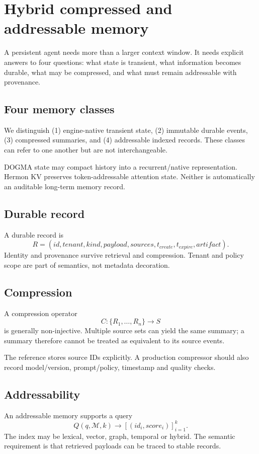 \chapter{Hybrid compressed and addressable memory}

A persistent agent needs more than a larger context window. It needs explicit answers to four questions: what state is transient, what information becomes durable, what may be compressed, and what must remain addressable with provenance.

\section{Four memory classes}
We distinguish (1) engine-native transient state, (2) immutable durable events, (3) compressed summaries, and (4) addressable indexed records. These classes can refer to one another but are not interchangeable.

DOGMA state may compact history into a recurrent/native representation. Hermon KV preserves token-addressable attention state. Neither is automatically an auditable long-term memory record.

\section{Durable record}
A durable record is
\[
R=(id,tenant,kind,payload,sources,t_{create},t_{expire},artifact).
\]
Identity and provenance survive retrieval and compression. Tenant and policy scope are part of semantics, not metadata decoration.

\section{Compression}
A compression operator
\[
C:\{R_1,\ldots,R_n\}\rightarrow S
\]
is generally non-injective. Multiple source sets can yield the same summary; a summary therefore cannot be treated as equivalent to its source events.

The reference stores source IDs explicitly. A production compressor should also record model/version, prompt/policy, timestamp and quality checks.

\section{Addressability}
An addressable memory supports a query
\[
Q(q,\mathcal M,k)\rightarrow[(id_i,score_i)]_{i=1}^k.
\]
The index may be lexical, vector, graph, temporal or hybrid. The semantic requirement is that retrieved payloads can be traced to stable records.

